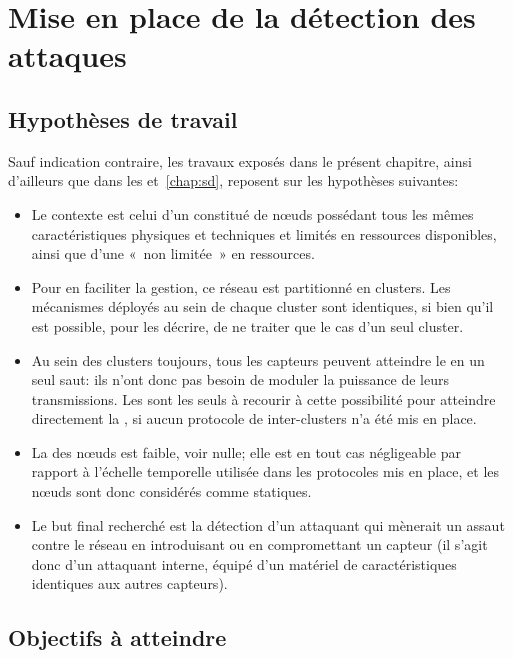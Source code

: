 \section{Mise en place de la détection des attaques}
\label{sa:sec:detection}
    \subsection{Hypothèses de travail}

Sauf indication contraire, les travaux exposés dans le présent chapitre, ainsi d'ailleurs que dans les  et~\ref{chap:sd}, reposent sur les hypothèses suivantes:
\begin{itemize}
    \item Le contexte est celui d'un \rcsf constitué de nœuds possédant tous les mêmes caractéristiques physiques et techniques et limités en ressources disponibles, ainsi que d'une \sdb « non limitée » en ressources.
    \item Pour en faciliter la gestion, ce réseau est partitionné en clusters. Les mécanismes déployés au sein de chaque cluster sont identiques, si bien qu'il est possible, pour les décrire, de ne traiter que le cas d'un seul cluster.
    \item Au sein des clusters toujours, tous les capteurs peuvent atteindre le \ch en un seul saut: ils n'ont donc pas besoin de moduler la puissance de leurs transmissions. Les \chs sont les seuls à recourir à cette possibilité pour atteindre directement la \sdb, si aucun protocole de  inter-clusters n'a été mis en place.
    \item La  des nœuds est faible, voir nulle; elle est en tout cas négligeable par rapport à l'échelle temporelle utilisée dans les protocoles mis en place, et les nœuds sont donc considérés comme statiques.
    \item Le but final recherché est la détection d'un attaquant qui mènerait un assaut contre le réseau en introduisant ou en compromettant un capteur (il s'agit donc d'un attaquant interne, équipé d'un matériel de caractéristiques identiques aux autres capteurs).
\end{itemize}

    \subsection{Objectifs à atteindre}

